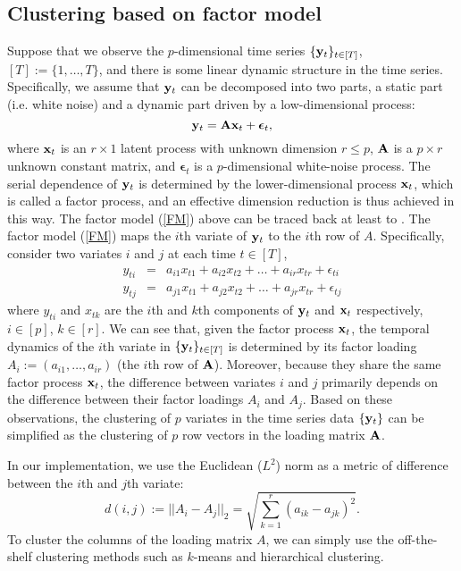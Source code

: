 \documentclass{article} %
\begin{document}
\subsection{Clustering based on factor model}
Suppose that we observe the $p$-dimensional time series $\{{\bf y}_t\}_{t\in[T]}$, $[T]:=\{1,\ldots,T\}$, and there is some linear dynamic structure in the time series. Specifically, we assume that ${\bf y}_t$ can be decomposed into two parts, a static part (i.e. white noise) and a dynamic part driven by a low-dimensional process:
\begin{equation}\label{FM}
{\bf y}_t={\bf A}{\bf x}_t+{\bm\epsilon}_t,
\end{equation}
where ${\bf x}_t$ is an $r\times 1$ latent process with unknown dimension $r\leq p$, $\bf A$ is a $p\times r$ unknown constant matrix, and ${\bm \epsilon}_t$ is a $p$-dimensional white-noise process. The serial dependence of ${\bf y}_t$ is determined by the lower-dimensional process ${\bf x}_t$, which is called a factor process, and an effective dimension reduction is thus achieved in this way. The factor model (\ref{FM}) above can be traced back at least to \cite{pb_fm87}. The factor model (\ref{FM}) maps the $i$th variate of ${\bf y}_t$ to the $i$th row of $A$. Specifically, consider two variates $i$ and $j$ at each time $t\in[T]$,
\begin{eqnarray}
y_{ti}&=& a_{i1}x_{t1}+a_{i2}x_{t2}+\ldots +a_{ir}x_{tr}+\epsilon_{ti}\nonumber\\
y_{tj}&=& a_{j1}x_{t1}+a_{j2}x_{t2}+\ldots +a_{jr}x_{tr}+\epsilon_{tj}\nonumber
\end{eqnarray}
where $y_{ti}$ and $x_{tk}$ are the $i$th and $k$th components of ${\bf y}_t$ and ${\bf x}_t$ respectively, $i\in[p]$, $k\in[r]$. We can see that, given the factor process ${\bf x}_t$, the temporal dynamics of the $i$th variate in $\{{\bf y}_t\}_{t\in[T]}$ is determined by its factor loading $A_i:=(a_{i1},\ldots ,a_{ir})$ (the $i$th row of $\bf A$). Moreover, because they share the same factor process ${\bf x}_t$, the difference between variates $i$ and $j$ primarily depends on the difference between their factor loadings $A_i$ and $A_j$. Based on these observations, the clustering of $p$ variates in the time series data $\{{\bf y}_t\}$ can be simplified as the clustering of $p$ row vectors in the loading matrix $\bf A$. 

In our implementation, we use the Euclidean ($L^2$) norm as a metric of difference between the $i$th and $j$th variate:
\[d(i,j):=||A_i-A_j||_2=\sqrt{\sum_{k=1}^r(a_{ik}-a_{jk})^2}.\]
To cluster the columns of the loading matrix $A$, we can simply use the off-the-shelf clustering methods such as $k$-means and hierarchical clustering. 
  
\end{document}
